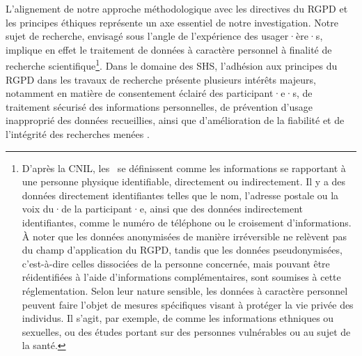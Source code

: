 \begin{refsegment}
L'alignement de notre approche méthodologique avec les directives du \acrfull{RGPD} et les principes éthiques représente un axe essentiel de notre investigation. Notre sujet de recherche, envisagé sous l'angle de l'expérience des usager·ère·s, implique en effet le traitement de données à caractère personnel à finalité de recherche scientifique\footnote{
D'après la \acrfull{CNIL}, les ~se définissent comme les informations se rapportant à une personne physique identifiable, directement ou indirectement. Il y a des données directement identifiantes telles que le nom, l'adresse postale ou la voix du·de la participant·e, ainsi que des données indirectement identifiantes, comme le numéro de téléphone ou le croisement d'informations. À noter que les données anonymisées de manière irréversible ne relèvent pas du champ d'application du \acrshort{RGPD}, tandis que les données pseudonymisées, c'est-à-dire celles dissociées de la personne concernée, mais pouvant être réidentifiées à l'aide d'informations complémentaires, sont soumises à cette réglementation. Selon leur nature sensible, les données à caractère personnel peuvent faire l'objet de mesures spécifiques visant à protéger la vie privée des individus. Il s'agit, par exemple, de  comme les informations ethniques ou sexuelles, ou des études portant sur des personnes vulnérables ou au sujet de la santé.
}. Dans le domaine des \acrfull{SHS}, l'adhésion aux principes du \acrshort{RGPD} dans les travaux de recherche présente plusieurs intérêts majeurs, notamment en matière de consentement éclairé des participant·e·s, de traitement sécurisé des informations personnelles, de prévention d'usage inapproprié des données recueillies, ainsi que d'amélioration de la fiabilité et de l'intégrité des recherches menées \textcolor{blue}{\autocite[465]{cotton_using_2010}}.%


\end{refsegment}
